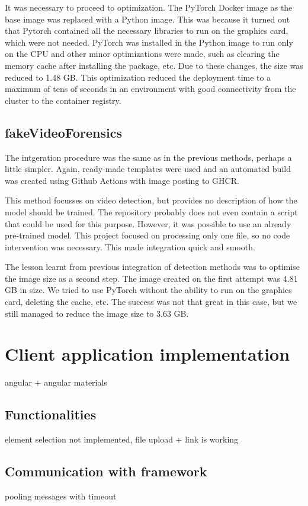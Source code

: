 It was necessary to proceed to optimization. The PyTorch Docker image as the base image was replaced with a Python image. This was because it turned out that Pytorch contained all the necessary libraries to run on the graphics card, which were not needed. PyTorch was installed in the Python image to run only on the CPU and other minor optimizations were made, such as clearing the memory cache after installing the package, etc. Due to these changes, the size was reduced to 1.48 GB. This optimization reduced the deployment time to a maximum of tens of seconds in an environment with good connectivity from the cluster to the container registry.

\section{fakeVideoForensics}

The intgeration procedure was the same as in the previous methods, perhaps a little simpler. Again, ready-made templates were used and an automated build was created using Github Actions with image posting to GHCR.

This method focusses on video detection, but provides no description of how the model should be trained. The repository probably does not even contain a script that could be used for this purpose. However, it was possible to use an already pre-trained model. This project focused on processing only one file, so no code intervention was necessary. This made integration quick and smooth.

The lesson learnt from previous integration of detection methods was to optimise the image size as a second step. The image created on the first attempt was 4.81 GB in size. We tried to use PyTorch without the ability to run on the graphics card, deleting the cache, etc. The success was not that great in this case, but we still managed to reduce the image size to 3.63 GB.

\chapter{Client application implementation}
angular + angular materials
\section{Functionalities}
element selection not implemented, file upload + link is working 
\section{Communication with framework}
pooling messages with timeout
